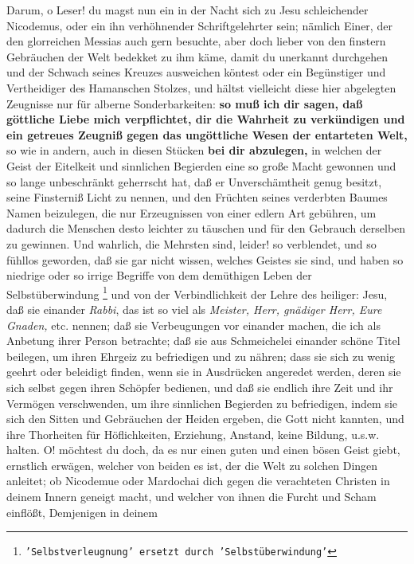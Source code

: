 Darum, o Leser! du magst nun ein in der Nacht sich zu Jesu schleichender
Nicodemus, oder ein ihn verhöhnender Schriftgelehrter
sein; nämlich Einer, der
den glorreichen Messias auch gern besuchte, aber doch lieber von den finstern
Gebräuchen der Welt bedekket zu ihm käme, damit du unerkannt durchgehen und der
Schwach seines Kreuzes ausweichen köntest oder ein Begünstiger und Vertheidiger
des Hamanschen Stolzes, und hältst vielleicht diese hier abgelegten
Zeugnisse
nur für alberne Sonderbarkeiten: \textbf{so muß ich dir sagen, daß göttliche
Liebe mich
verpflichtet, dir die Wahrheit zu verkündigen und ein getreues
Zeugniß gegen das
ungöttliche Wesen der entarteten Welt,} so wie in andern, auch in diesen Stücken
\textbf{bei dir abzulegen,} in welchen der Geist der Eitelkeit und sinnlichen
Begierden
eine so große Macht gewonnen und so lange unbeschränkt geherrscht hat, daß er
Unverschämtheit genug besitzt, seine Finsterniß Licht zu nennen, und den
Früchten seines verderbten Baumes Namen beizulegen, die nur Erzeugnissen von
einer edlern Art gebühren, um dadurch die Menschen desto leichter zu täuschen
und für den Gebrauch derselben zu gewinnen. Und wahrlich, die Mehrsten sind,
leider! so verblendet, und so fühllos geworden, daß sie gar nicht wissen,
welches Geistes sie sind, und haben so niedrige oder so irrige Begriffe von dem
demüthigen Leben der Selbstüberwindung
\footnote{\texttt{'Selbstverleugnung' ersetzt durch 'Selbstüberwindung'}} und
von der Verbindlichkeit der Lehre des
heiliger: Jesu, daß sie einander \textit{Rabbi}, das ist so viel als
\textit{Meister,
Herr, gnädiger Herr, Eure Gnaden,} etc. nennen; daß sie Verbeugungen vor
einander machen, die ich als Anbetung ihrer Person betrachte; daß sie aus
Schmeichelei einander schöne Titel beilegen, um ihren Ehrgeiz zu befriedigen und
zu nähren; dass sie sich zu wenig geehrt oder beleidigt finden, wenn sie in
Ausdrücken angeredet werden, deren sie sich selbst gegen ihren Schöpfer
bedienen, und daß sie endlich ihre Zeit und ihr Vermögen verschwenden, um ihre
sinnlichen Begierden zu befriedigen, indem sie sich den Sitten und Gebräuchen
der Heiden ergeben, die Gott nicht kannten, und ihre Thorheiten für
Höflichkeiten, Erziehung, Anstand, keine Bildung, u.s.w. halten. O! möchtest
du doch, da es nur einen guten und einen bösen Geist giebt, ernstlich erwägen,
welcher von beiden es ist, der die Welt zu solchen Dingen anleitet; ob Nicodemue
oder Mardochai dich gegen die verachteten Christen in
deinem Innern geneigt
macht, und welcher von ihnen die Furcht und Scham einflößt, Demjenigen in deinem
